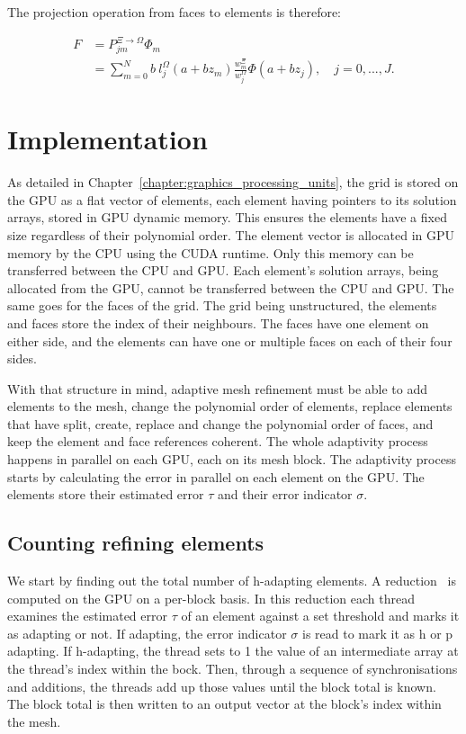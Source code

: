 The projection operation from faces to elements is therefore:

\begin{align} \label{projection_face_to_element}
	F &= P^{\Xi \rightarrow \Omega}_{jm} \Phi_m  \\
	&= \sum_{m = 0}^{N} b \: l_j^{\Omega}(a + bz_m)\frac{w_m^{\Xi}}{w_j^{\Omega}} \Phi (a + b z_j), \quad j = 0, ..., J.
\end{align}

\section{Implementation} \label{section:adaptive_mesh_refinement:implementation}

As detailed in Chapter~\ref{chapter:graphics_processing_units}, the grid is stored on the GPU as a
flat vector of elements, each element having pointers to its solution arrays, stored in GPU dynamic
memory. This ensures the elements have a fixed size regardless of their polynomial order. The
element vector is allocated in GPU memory by the CPU using the CUDA runtime. Only this memory can be
transferred between the CPU and GPU. Each element's solution arrays, being allocated from the GPU,
cannot be transferred between the CPU and GPU. The same goes for the faces of the grid. The grid
being unstructured, the elements and faces store the index of their neighbours. The faces have one
element on either side, and the elements can have one or multiple faces on each of their four sides.

With that structure in mind, adaptive mesh refinement must be able to add elements to the mesh,
change the polynomial order of elements, replace elements that have split, create, replace and
change the polynomial order of faces, and keep the element and face references coherent. The whole
adaptivity process happens in parallel on each GPU, each on its mesh block. The adaptivity process
starts by calculating the error in parallel on each element on the GPU. The elements store their
estimated error $\tau$ and their error indicator $\sigma$.

\subsection{Counting refining elements} \label{section:adaptive_mesh_refinement:implementation:counting_refining_elements}


We start by finding out the total number of h-adapting elements. A reduction~\cite{Harris2007} is
computed on the GPU on a per-block basis. In this reduction each thread examines the estimated error
$\tau$ of an element against a set threshold and marks it as adapting or not. If adapting, the error
indicator $\sigma$ is read to mark it as h or p adapting. If h-adapting, the thread sets to 1 the
value of an intermediate array at the thread's index within the bock. Then, through a sequence of
synchronisations and additions, the threads add up those values until the block total is known. The
block total is then written to an output vector at the block's index within the mesh.

